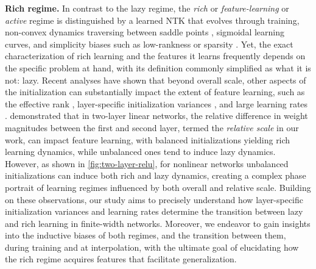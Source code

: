 \documentclass{article}
\theoremstyle{plain}
\theoremstyle{definition}
\theoremstyle{remark}
\begin{document}
\textbf{Rich regime.}
%
In contrast to the lazy regime, the \emph{rich} or \emph{feature-learning} or \emph{active} regime is distinguished by a learned NTK that evolves through training, non-convex dynamics traversing between saddle points \cite{saxe2013exact, saxe2019mathematical,jacot2021saddle}, sigmoidal learning curves, and simplicity biases such as low-rankness \cite{li2020towards} or sparsity \cite{woodworth2020kernel}.
%
Yet, the exact characterization of rich learning and the features it learns frequently depends on the specific problem at hand, with its definition commonly simplified as what it is not: lazy.
%
Recent analyses have shown that beyond overall scale, other aspects of the initialization can substantially impact the extent of feature learning, such as the effective rank \cite{liu2023connectivity}, layer-specific initialization variances \cite{yang2020feature, luo2021phase, yang2022tensor}, and large learning rates \cite{lewkowycz2020large, ba2022high, zhu2023catapults, cui2024asymptotics}. 
%
\citet{azulay2021implicit} demonstrated that in two-layer linear networks, the relative difference in weight magnitudes between the first and second layer, termed the \emph{relative scale} in our work, can impact feature learning, with balanced initializations yielding rich learning dynamics, while unbalanced ones tend to induce lazy dynamics.
%
However, as shown in \cref{fig:two-layer-relu}, for nonlinear networks unbalanced initializations can induce both rich and lazy dynamics,  creating a complex phase portrait of learning regimes influenced by both overall and relative scale.
%
Building on these observations, our study aims to precisely understand how layer-specific initialization variances and learning rates determine the transition between lazy and rich learning in finite-width networks.
%
Moreover, we endeavor to gain insights into the inductive biases of both regimes, and the transition between them, during training and at interpolation, with the ultimate goal of elucidating how the rich regime acquires features that facilitate generalization.
\end{document}
